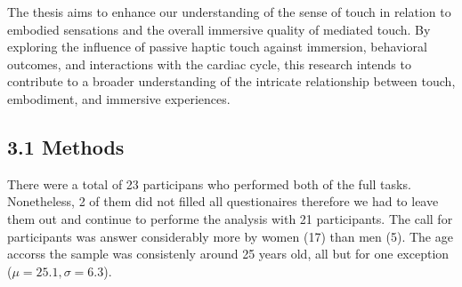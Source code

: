 \documentclass[12pt,oneside,openright]{report}
\begin{document}
  The thesis aims to enhance our understanding of the sense of touch in relation to embodied sensations and the overall immersive quality of mediated touch. By exploring the influence of passive haptic touch against immersion, behavioral outcomes, and interactions with the cardiac cycle, this research intends to contribute to a broader understanding of the intricate relationship between touch, embodiment, and immersive experiences.

\subsection*{3.1 Methods}

There were a total of 23 participans who performed both of the full tasks. Nonetheless, 2 of them did not filled all questionaires therefore we had to leave them out and continue to performe the analysis with 21 participants. The call for participants was answer considerably more by women (17) than men (5). The age accorss the sample was consistenly around 25 years old, all but for one exception ($\mu=25.1 , \sigma=6.3$).
\end{document}
